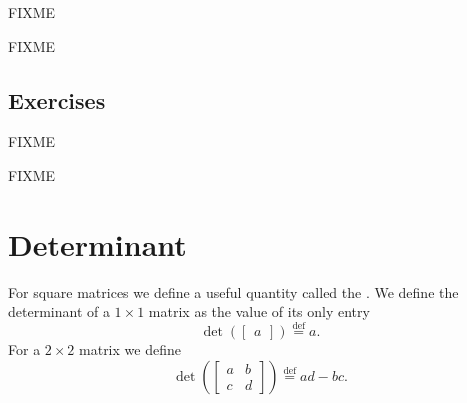\begin{example}
FIXME
\end{example}

FIXME

\subsection{Exercises}

FIXME

\setcounter{exercise}{100}

FIXME


\sectionnewpage
\section{Determinant}
\label{det:section}


For square matrices we define a useful quantity called the
\emph{}.  We define
the determinant of a $1 \times 1$ matrix as the value of its only entry
\begin{equation*}
\det \left(
\begin{bmatrix}
a 
\end{bmatrix}
\right)
\overset{\text{def}}{=}
a .
\end{equation*}
For a $2 \times 2$ matrix we define
\begin{equation*}
\det \left(
\begin{bmatrix}
a & b \\
c & d
\end{bmatrix}
\right)
\overset{\text{def}}{=}
ad-bc .
\end{equation*}


